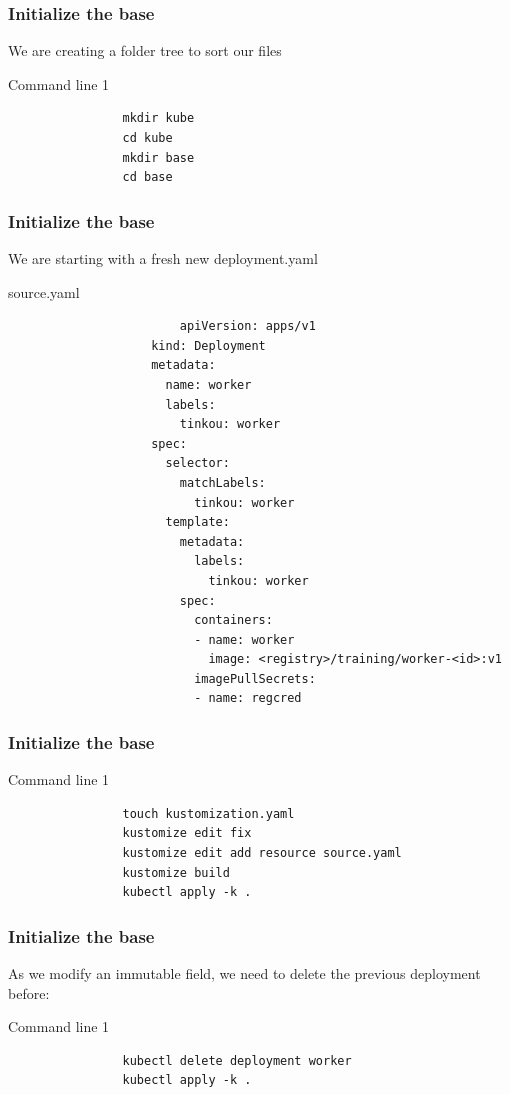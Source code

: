 	\begin{frame}[fragile]
		\frametitle{Initialize the base}
		
		We are creating a folder tree to sort our files
		\begin{block}{Command line 1}
			\begin{verbatim}
				mkdir kube
				cd kube
				mkdir base
				cd base
			\end{verbatim}
		\end{block}
	\end{frame}
	
	\begin{frame}[fragile]
		\frametitle{Initialize the base}
		
		We are starting with a fresh new deployment.yaml
		\begin{block}{source.yaml}
			\begin{tiny}
				\begin{verbatim}
						apiVersion: apps/v1
					kind: Deployment
					metadata:
					  name: worker
					  labels:
					    tinkou: worker
					spec:
					  selector:
					    matchLabels:
					      tinkou: worker
					  template:
					    metadata:
					      labels:
					        tinkou: worker
					    spec:
					      containers:
					      - name: worker
					        image: <registry>/training/worker-<id>:v1
					      imagePullSecrets:
					      - name: regcred
				\end{verbatim}
			\end{tiny}
		\end{block}
	\end{frame}
	
	\begin{frame}[fragile]
		\frametitle{Initialize the base}
		\begin{block}{Command line 1}
			\begin{verbatim}
				touch kustomization.yaml
				kustomize edit fix
				kustomize edit add resource source.yaml
				kustomize build
				kubectl apply -k .
			\end{verbatim}
		\end{block}
	\end{frame}
	
	\begin{frame}[fragile]
		\frametitle{Initialize the base}
		As we modify an immutable field, we need to delete the previous deployment before:
		\begin{block}{Command line 1}
			\begin{verbatim}
				kubectl delete deployment worker
				kubectl apply -k .
			\end{verbatim}
		\end{block}
	\end{frame}
	
